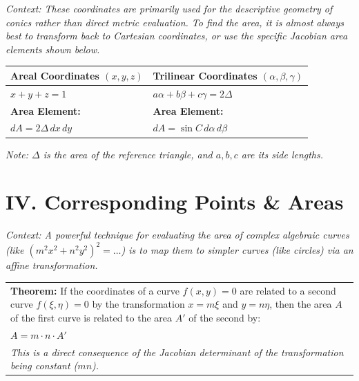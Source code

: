 \documentclass[11pt, a4paper]{article}
\begin{document}
\textit{\small Context: These coordinates are primarily used for the descriptive geometry of conics rather than direct metric evaluation. To find the area, it is almost always best to transform back to Cartesian coordinates, or use the specific Jacobian area elements shown below.}

\begin{center}
\begin{tabular}{@{}p{} p{}@{}}
\toprule
\textbf{Areal Coordinates $(x,y,z)$} & \textbf{Trilinear Coordinates $(\alpha,\beta,\gamma)$} \\
\midrule
$x + y + z = 1$ & $a\alpha + b\beta + c\gamma = 2\Delta$ \\
\midrule
\textbf{\color{accent}Area Element:} & \textbf{\color{accent}Area Element:} \\
$dA = 2\Delta \, dx \, dy$ & $dA = \sin C \, d\alpha \, d\beta$ \\
\bottomrule
\end{tabular}
\end{center}

\vspace{0.2cm}
\textit{\small Note: $\Delta$ is the area of the reference triangle, and $a,b,c$ are its side lengths.}

\section*{\color{primary} IV. Corresponding Points \& Areas}

\textit{\small Context: A powerful technique for evaluating the area of complex algebraic curves (like $(m^2x^2+n^2y^2)^2 = \dots$) is to map them to simpler curves (like circles) via an affine transformation.}

\begin{center}
\begin{tabular}{@{}p{}@{}}
\toprule
\textbf{\color{accent}Theorem:} If the coordinates of a curve $f(x,y)=0$ are related to a second curve $f(\xi,\eta)=0$ by the transformation $x = m\xi$ and $y = n\eta$, then the area $A$ of the first curve is related to the area $A'$ of the second by: \\
$A = m \cdot n \cdot A'$ \\
\textit{\small This is a direct consequence of the Jacobian determinant of the transformation being constant ($mn$).} \\
\bottomrule
\end{tabular}
\end{center}
\end{document}
